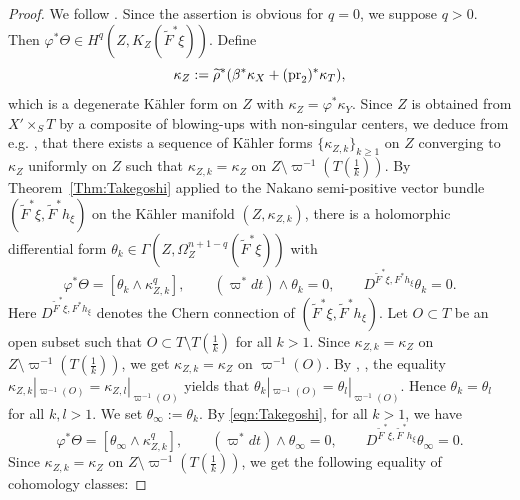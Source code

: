 \documentclass[amscd, leqno]{amsart}
\theoremstyle{plain}
\theoremstyle{definition}
\theoremstyle{remark}
\newenvironment{pf}{\begin{proof}}{\end{proof}}
\begin{document}
\begin{pf}
We follow \cite[Prop.\,4.4]{MourouganeTakayama09}.
Since the assertion is obvious for $q=0$, we suppose $q>0$. Then $\varphi^{*}\Theta\in H^{q}(Z, K_{Z}(\widetilde{F}^{*}\xi))$.
Define 
$$
\kappa_{Z} := \widetilde{\rho}^{*}( \beta^{*}\kappa_{X} + ({\rm pr}_{2})^{*}\kappa_{T} ),
$$ 
which is a degenerate K\"ahler form on $Z$ with $\kappa_{Z} = \varphi^{*}\kappa_{Y}$. 
Since $Z$ is obtained from $X'\times_{S}T$ by a composite of blowing-ups with non-singular centers,
we deduce from e.g. \cite[Prop.\,12.4]{Demailly12}, \cite[Proof of Prop.\,4.4 Step 1]{MourouganeTakayama09} that 
there exists a sequence of K\"ahler forms $\{\kappa_{Z,k}\}_{k\geq1}$ on $Z$ converging to $\kappa_{Z}$ uniformly on $Z$
such that $\kappa_{Z,k}=\kappa_{Z}$ on $Z\setminus\varpi^{-1}(T(\frac{1}{k}))$.
By Theorem~\ref{Thm:Takegoshi} applied to the Nakano semi-positive vector bundle $(\widetilde{F}^{*}\xi, \widetilde{F}^{*}h_{\xi})$ 
on the K\"ahler manifold $(Z,\kappa_{Z,k})$, 
there is a holomorphic differential form $\theta_{k}\in \Gamma(Z,\Omega_{Z}^{n+1-q}(\widetilde{F}^{*}\xi))$ with
\begin{equation}
\label{eqn:Takegoshi}
\varphi^{*}\Theta=[\theta_{k}\wedge\kappa_{Z,k}^{q}],
\qquad
(\varpi^{*}dt)\wedge\theta_{k}=0,
\qquad
D^{\widetilde{F}^{*}\xi, F^{*}h_{\xi}} \theta_{k} =0.
\end{equation}
Here $D^{\widetilde{F}^{*}\xi, F^{*}h_{\xi}}$ denotes the Chern connection of $(\widetilde{F}^{*}\xi, \widetilde{F}^{*}h_{\xi})$.
Let $O \subset T$ be an open subset  such that $O \subset T\setminus T(\frac{1}{k})$ for all $k>1$.
Since $\kappa_{Z,k}=\kappa_{Z}$ on $Z\setminus\varpi^{-1}(T(\frac{1}{k}))$, we get $\kappa_{Z,k}=\kappa_{Z}$ on $\varpi^{-1}(O)$.
By \cite[Th.\,5.2 (iv)]{Takegoshi95}, \cite[Proof of Prop.\,4.4 Step 3]{MourouganeTakayama09}, 
the equality $\kappa_{Z,k}|_{\varpi^{-1}(O)}=\kappa_{Z,l}|_{\varpi^{-1}(O)}$ yields that $\theta_{k}|_{\varpi^{-1}(O)}=\theta_{l}|_{\varpi^{-1}(O)}$. 
Hence $\theta_{k}=\theta_{l}$ for all $k,l>1$. We set $\theta_{\infty}:=\theta_{k}$. By \eqref{eqn:Takegoshi}, for all $k>1$, we have
\begin{equation}
\label{eqn:Takegoshi:2}
\varphi^{*}\Theta=[\theta_{\infty}\wedge\kappa_{Z,k}^{q}],
\qquad
(\varpi^{*}dt)\wedge\theta_{\infty}=0,
\qquad
D^{\widetilde{F}^{*}\xi, \widetilde{F}^{*}h_{\xi}} \theta_{\infty} =0.
\end{equation} 
Since $\kappa_{Z,k}=\kappa_{Z}$ on $Z\setminus\varpi^{-1}(T(\frac{1}{k}))$, we get the following equality of cohomology classes:

\end{pf}
\end{document}
